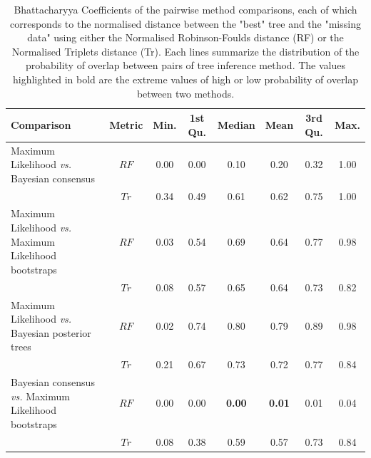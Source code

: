 \documentclass[12pt,letterpaper]{article}
\begin{document}
%    

\newpage

\begin{landscape}
\begin{table}[ht]
\caption{
Bhattacharyya Coefficients of the pairwise method comparisons, each of which corresponds to the normalised distance between the "best" tree and the "missing data" using either the Normalised Robinson-Foulds distance (RF) or the Normalised Triplets distance (Tr). Each lines summarize the distribution of the probability of overlap between pairs of tree inference method. The values highlighted in bold are the extreme values of high or low probability of overlap between two methods.}
\centering
\begin{tabular}{lccccccc}
  \hline
 Comparison &  Metric & Min. & 1st Qu. & Median & Mean & 3rd Qu. & Max. \\ 
  \hline
    Maximum Likelihood \textit{vs.} Bayesian consensus                 & $RF$ & 0.00 & 0.00 & 0.10 & 0.20 & 0.32 & 1.00 \\ 
                                                                       & $Tr$ & 0.34 & 0.49 & 0.61 & 0.62 & 0.75 & 1.00 \\ 
    Maximum Likelihood \textit{vs.} Maximum Likelihood bootstraps      & $RF$ & 0.03 & 0.54 & 0.69 & 0.64 & 0.77 & 0.98 \\ 
                                                                       & $Tr$ & 0.08 & 0.57 & 0.65 & 0.64 & 0.73 & 0.82 \\ 
    Maximum Likelihood \textit{vs.} Bayesian posterior trees           & $RF$ & 0.02 & 0.74 & 0.80 & 0.79 & 0.89 & 0.98 \\ 
                                                                       & $Tr$ & 0.21 & 0.67 & 0.73 & 0.72 & 0.77 & 0.84 \\ 
    Bayesian consensus \textit{vs.} Maximum Likelihood bootstraps      & $RF$ & 0.00 & 0.00 & \textbf{0.00} & \textbf{0.01} & 0.01 & 0.04 \\ 
                                                                       & $Tr$ & 0.08 & 0.38 & 0.59 & 0.57 & 0.73 & 0.84 \\ 

\end{tabular}
\end{table}
\end{landscape}
\end{document}
